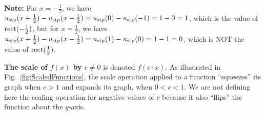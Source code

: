 \textbf{Note:} For  $x= - \frac{1}{2} $, we have $u_{\rm stp}(x+\frac{1}{2}) -  u_{\rm stp}(x- \frac{1}{2})= u_{\rm stp}(0) -  u_{\rm stp}(- 1)= 1 - 0 = 1$, which is the value of ${\rm rect}(-\frac{1}{2})$, but for $x=  \frac{1}{2} $, we have $u_{\rm stp}(x+\frac{1}{2}) -  u_{\rm stp}(x- \frac{1}{2})= u_{\rm stp}(1) -  u_{\rm stp}(0)= 1 - 1 = 0$, which is NOT the value of ${\rm rect}(\frac{1}{2})$.

\Qed

\bigskip
\textbf{The scale of $f(x)$ by $c \neq 0 $} is denoted $f(c \cdot x)$. As illustrated in Fig.~\ref{fig:ScaledFunctions}, the scale operation applied to a function ``squeezes'' its graph when $c>1$ and expands its graph, when $0 < c < 1$. We are not defining here the scaling operation for negative values of $c$ because it also ``flips'' the function about the $y$-axis. 


